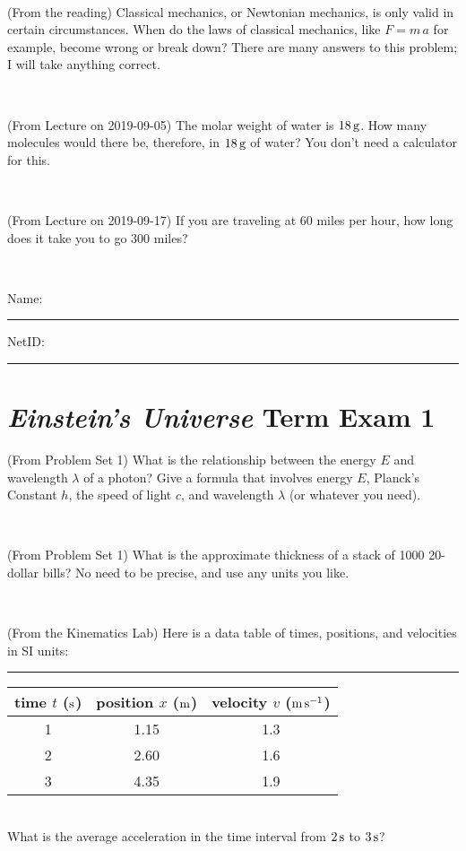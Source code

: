 \documentclass[12pt, letterpaper]{article}
\begin{document}
\vfill ~

\begin{problem} (From the reading)
Classical mechanics, or Newtonian mechanics, is only valid in certain
circumstances. When do the laws of classical mechanics, like $F =
m\,a$ for example, become wrong or break down? There are many answers
to this problem; I will take anything correct.
\end{problem}


\vfill ~

\begin{problem} (From Lecture on 2019-09-05)
The molar weight of water is $18\,\mathrm{g}$. How many molecules would there
be, therefore, in $18\,\mathrm{g}$ of water? You don't need a calculator for
this.
\end{problem}


\vfill ~

\begin{problem} (From Lecture on 2019-09-17)
If you are traveling at 60 miles per hour, how long does
it take you to go 300 miles?
\end{problem}


\vfill ~


\cleardoublepage



\noindent
Name: \rule[-1ex]{0.60\textwidth}{0.1pt}
NetID: \rule[-1ex]{0.20\textwidth}{0.1pt}

\section*{\textsl{Einstein's Universe} Term Exam 1}
\setcounter{problem}{1}


\begin{problem} (From Problem Set 1)
What is the relationship between the energy $E$ and wavelength
$\lambda$ of a photon? Give a formula that involves energy $E$,
Planck's Constant $h$, the speed of light $c$, and wavelength
$\lambda$ (or whatever you need).
\end{problem}

\vfill ~

\begin{problem} (From Problem Set 1)
What is the approximate thickness of a stack of 1000 20-dollar bills?
No need to be precise, and use any units you like.
\end{problem}


\vfill ~

\begin{problem} (From the Kinematics Lab)
Here is a data table of times, positions, and velocities in SI units:\\
\rule{1.0in}{0pt}\begin{tabular}{c|c|c}
time $t$ ($\mathrm{s}$) & position $x$ ($\mathrm{m}$) & velocity $v$ ($\mathrm{m}\,\mathrm{s}^{-1}$) \\
\hline
1 & 1.15 & 1.3 \\
2 & 2.60 & 1.6 \\
3 & 4.35 & 1.9 \\
\hline
\end{tabular}\\
What is the average acceleration in the time interval from $2\,\mathrm{s}$ to $3\,\mathrm{s}$?
\end{problem}
\end{document}
